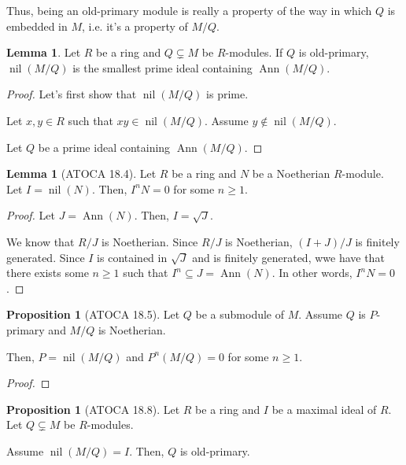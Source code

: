 \documentclass{article}
\theoremstyle{definition}
\newtheorem{lemma}[theorem]{Lemma}
\newtheorem{proposition}[theorem]{Proposition}
\newcommand{\nil}{\operatorname{nil}}
\newcommand{\ann}{\operatorname{Ann}}
\begin{document}
Thus, being an old-primary module is really a property of the way
in which $ Q $ is embedded in $ M $, i.e. it's a property of $ M/Q $.

\begin{lemma}
    Let $ R $ be a ring and $ Q \subsetneq M $ be $ R $-modules.
    If $ Q $ is old-primary, $ \nil(M/Q) $ is the smallest prime ideal 
    containing $ \ann(M/Q) $.
\end{lemma}
\begin{proof}
    Let's first show that $ \nil(M/Q) $ is prime.

    Let $ x,y \in R $ such that $ xy \in \nil(M/Q) $.
    Assume $ y \notin \nil(M/Q) $.

    Let $ Q $ be a prime ideal containing $ \ann(M/Q) $.


\end{proof}

\begin{lemma}[ATOCA 18.4]
    Let $ R $ be a ring and $ N $ be a Noetherian $ R $-module.
    Let $ I = \nil(N) $. Then, $ I^{n}N = 0 $ for some $ n \geq 1 $.
\end{lemma}
\begin{proof}
    Let $ J = \ann(N) $.
    Then, $ I = \sqrt{J} $.

    We know that $ R/J $ is Noetherian.
    Since $ R/J $ is Noetherian, $ (I + J) / J $ is finitely generated.
    Since $ I $ is contained in $ \sqrt{J} $ and is finitely generated,
    wwe have that there exists some $ n \geq 1 $ such that $ I^{n} \subseteq J = \ann(N) $.
    In other words, $ I^{n}N = 0 $. 
\end{proof}

\begin{proposition}[ATOCA 18.5]
    Let $ Q $ be a submodule of $ M $.
    Assume $ Q $ is $ P $-primary and $ M/Q $ is Noetherian.

    Then, $ P = \nil(M/Q) $ and $ P^{n} (M/Q) = 0 $ for some $ n \geq 1 $.
\end{proposition}
\begin{proof}
    
\end{proof}

\begin{proposition}[ATOCA 18.8]
    Let $ R $ be a ring and $ I $ be a maximal ideal of $ R $.
    Let $ Q \subsetneq M $ be $ R $-modules.

    Assume $ \nil(M/Q) = I $. Then, $ Q $ is old-primary.
\end{proposition}
\end{document}
